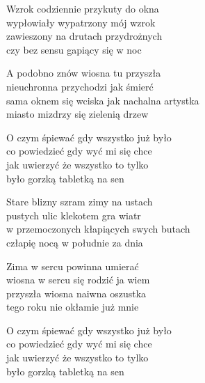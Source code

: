 \begin{text}
    Wzrok codziennie przykuty do okna\\
    wypłowiały wypatrzony mój wzrok\\
    zawieszony na drutach przydrożnych\\
    czy bez sensu gapiący się w noc

    A podobno znów wiosna tu przyszła\\
    nieuchronna przychodzi jak śmierć\\
    sama oknem się wciska jak nachalna artystka\\
    miasto mizdrzy się zielenią drzew

    O czym śpiewać gdy wszystko już było\\
    co powiedzieć gdy wyć mi się chce\\
    jak uwierzyć że wszystko to tylko\\
    było gorzką tabletką na sen

    Stare blizny szram zimy na ustach\\
    pustych ulic klekotem gra wiatr\\
    w przemoczonych kłapiących swych butach\\
    człapię nocą w południe za dnia

    Zima w sercu powinna umierać\\
    wiosna w sercu się rodzić ja wiem\\
    przyszła wiosna naiwna oszustka\\
    tego roku nie okłamie już mnie

    O czym śpiewać gdy wszystko już było\\
    co powiedzieć gdy wyć mi się chce\\
    jak uwierzyć że wszystko to tylko\\
    było gorzką tabletką na sen
\end{text}
\begin{chord}

\end{chord}